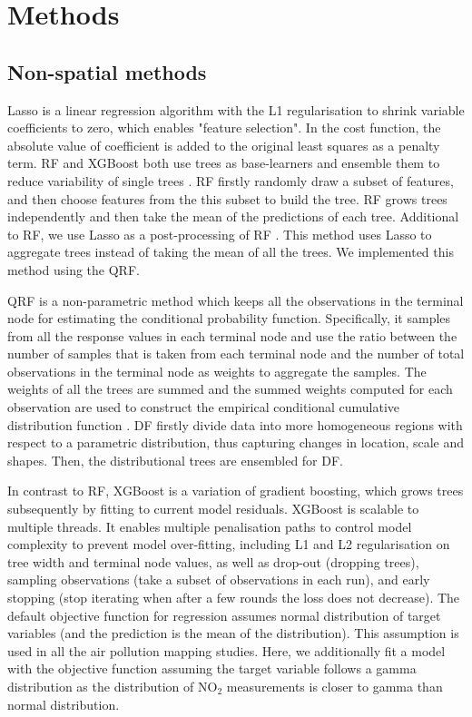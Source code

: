 \documentclass{article}
\begin{document}
\section {Methods}

\subsection{Non-spatial methods}
Lasso is a linear regression algorithm with the L1 regularisation to shrink variable coefficients to zero, which enables "feature selection". In the cost function, the absolute value of coefficient is added to the original least squares as a penalty term. RF and XGBoost both use trees as base-learners and ensemble them to reduce variability of single trees \citep{friedman2001greedy}. RF firstly randomly draw a subset of features, and then choose features from the this subset to build the tree. RF \citep{breiman2001random} grows trees independently and then take the mean of the predictions of each tree. Additional to RF, we use Lasso as a post-processing of RF \citep[,][page 617]{hastie2017elements}. This method uses Lasso to aggregate trees instead of taking the mean of all the trees. We implemented this method using the QRF. 

QRF is a non-parametric method which keeps all the observations in the terminal node for estimating the conditional probability function. Specifically, it samples from all the response values in each terminal node and use the ratio between the number of samples that is taken from each terminal node and the number of total observations in the terminal node as weights to aggregate the samples. The weights of all the trees are summed and the summed weights computed for each observation are used to construct the empirical conditional cumulative distribution function \citep{meinshausen2006quantile}. DF firstly divide data into more homogeneous regions with respect to a parametric distribution, thus capturing changes in location, scale and shapes. Then, the distributional trees are ensembled for DF.

In contrast to RF, XGBoost  is a variation of gradient boosting, which grows trees subsequently by fitting to current model residuals. XGBoost is scalable to multiple threads. It enables multiple penalisation paths to control model complexity to prevent model over-fitting, including L1 and L2 regularisation on tree width and terminal node values, as well as drop-out (dropping trees), sampling observations (take a subset of observations in each run), and early stopping (stop iterating when after a few rounds the loss does not decrease). The default objective function for regression assumes normal distribution of target variables (and the prediction is the mean of the distribution). This assumption is used in all the air pollution mapping studies. Here, we additionally fit a model with the objective function assuming the target variable follows a gamma distribution as the distribution of NO$_2$ measurements is closer to gamma than normal distribution.  
\end{document}
